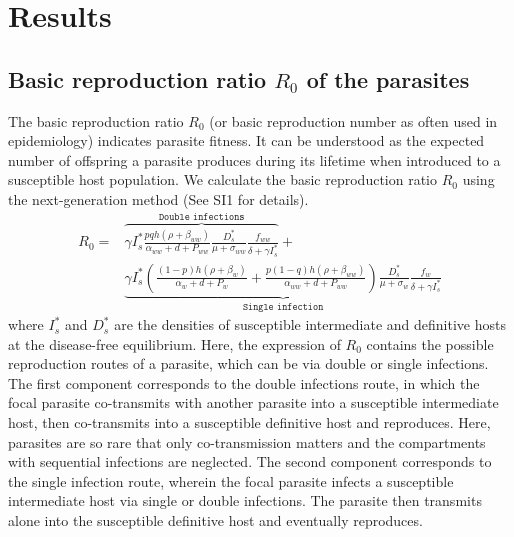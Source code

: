 \documentclass[a4paper]{scrartcl}
\begin{document}
\section*{Results}
\subsection*{Basic reproduction ratio $R_0$ of the parasites}

The basic reproduction ratio $R_0$ (or basic reproduction number as often used in epidemiology) indicates parasite fitness. 
It can be understood as the expected number of offspring a parasite produces during its lifetime when introduced to a susceptible host population. 
We calculate the basic reproduction ratio $R_0$ using the next-generation method \citep{Diekmann1990, Diekmann2009, hurford:JRSI:2010} (See SI1 for details).
%
\begin{align}
R_0 = & \overbrace{\gamma I_s^* \frac{p q h (\rho +  \beta_{ww})}{\alpha_{ww} + d + P_{ww}} \frac{D_s^*}{\mu +\sigma_{ww}} \frac{f_{ww}}{\delta +\gamma I_s^*}}^{ \texttt{Double infections}} + \nonumber \\
& \underbrace{\gamma  I_s^* \left( \frac{ (1-p) h (\rho + \beta_w)}{\alpha_w + d + P_w} + \frac{p (1-q) h (\rho + \beta_{ww})}{\alpha_{ww} + d + P_{ww}} \right) \frac{D_s^*}{\mu + \sigma_w} \frac{f_w}{\delta +\gamma  I_s^*}}_{\texttt{Single infection}}
\end{align}
%
where $I_s^*$ and $D_s^*$ are the densities of susceptible intermediate and definitive hosts at the disease-free equilibrium. 
Here, the expression of $R_0$ contains the possible reproduction routes of a parasite, which can be via double or single infections. 
The first component corresponds to the double infections route, in which the focal parasite co-transmits with another parasite into a susceptible intermediate host, then co-transmits into a susceptible definitive host and reproduces. 
Here, parasites are so rare that only co-transmission matters and the compartments with sequential infections are neglected. 
The second component corresponds to the single infection route, wherein the focal parasite infects a susceptible intermediate host via single or double infections. 
The parasite then transmits alone into the susceptible definitive host and eventually reproduces. 
\end{document}
